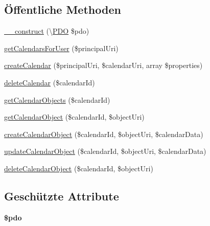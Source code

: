 \subsection*{Öffentliche Methoden}
\begin{DoxyCompactItemize}
\item 
\mbox{\hyperlink{class_sabre_1_1_cal_d_a_v_1_1_backend_1_1_simple_p_d_o_ab4b9f4ee595f715c27f62774c649163b}{\+\_\+\+\_\+construct}} (\textbackslash{}\mbox{\hyperlink{class_sabre_1_1_cal_d_a_v_1_1_backend_1_1_p_d_o}{P\+DO}} \$pdo)
\item 
\mbox{\hyperlink{class_sabre_1_1_cal_d_a_v_1_1_backend_1_1_simple_p_d_o_af10ea58aabe1645bc2a6d4845dccda12}{get\+Calendars\+For\+User}} (\$principal\+Uri)
\item 
\mbox{\hyperlink{class_sabre_1_1_cal_d_a_v_1_1_backend_1_1_simple_p_d_o_ae765390abf75b7111396a55e13fa965f}{create\+Calendar}} (\$principal\+Uri, \$calendar\+Uri, array \$properties)
\item 
\mbox{\hyperlink{class_sabre_1_1_cal_d_a_v_1_1_backend_1_1_simple_p_d_o_ab183f12a8eaa7ac0dbbcd2b17ddf56ac}{delete\+Calendar}} (\$calendar\+Id)
\item 
\mbox{\hyperlink{class_sabre_1_1_cal_d_a_v_1_1_backend_1_1_simple_p_d_o_a11bae2bb246b02189eb896efbf3a1454}{get\+Calendar\+Objects}} (\$calendar\+Id)
\item 
\mbox{\hyperlink{class_sabre_1_1_cal_d_a_v_1_1_backend_1_1_simple_p_d_o_a0fd702e04bedfb3ae2156e9d6477a49b}{get\+Calendar\+Object}} (\$calendar\+Id, \$object\+Uri)
\item 
\mbox{\hyperlink{class_sabre_1_1_cal_d_a_v_1_1_backend_1_1_simple_p_d_o_a900bb6e1992a55d4df36d9d0157759c2}{create\+Calendar\+Object}} (\$calendar\+Id, \$object\+Uri, \$calendar\+Data)
\item 
\mbox{\hyperlink{class_sabre_1_1_cal_d_a_v_1_1_backend_1_1_simple_p_d_o_ae2b17157379fdb4720f51fb63d895e48}{update\+Calendar\+Object}} (\$calendar\+Id, \$object\+Uri, \$calendar\+Data)
\item 
\mbox{\hyperlink{class_sabre_1_1_cal_d_a_v_1_1_backend_1_1_simple_p_d_o_a6fb588682ff0bb6afd52ad5fbe1f6955}{delete\+Calendar\+Object}} (\$calendar\+Id, \$object\+Uri)
\end{DoxyCompactItemize}
\subsection*{Geschützte Attribute}
\begin{DoxyCompactItemize}
\item 
\mbox{\label{class_sabre_1_1_cal_d_a_v_1_1_backend_1_1_simple_p_d_o_ae937c0c4769ac5181c13e44bf9b0e809}} 
{\bfseries \$pdo}
\end{DoxyCompactItemize}
